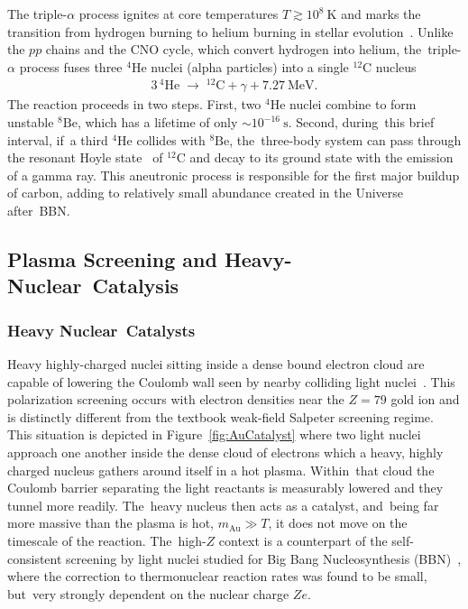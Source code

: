 \documentclass[particles,article,accept,pdftex,moreauthors]{Definitions/mdpi}
\begin{document}
The triple-$\alpha$ process ignites at core temperatures $T \gtrsim 10^{8}~\mathrm{K}$ and marks the transition from hydrogen burning to helium burning in stellar evolution~\cite{Suno:2016fjb}. Unlike the $pp$ chains and the CNO cycle, which convert hydrogen into helium, the~triple-$\alpha$ process fuses three ${}^{4}\mathrm{He}$ nuclei (alpha particles) into a single ${}^{12}\mathrm{C}$ nucleus
\begin{align}
3\,{}^{4}\mathrm{He} \;\longrightarrow\; {}^{12}\mathrm{C} + \gamma + 7.27~\mathrm{MeV}.
\end{align}
The reaction proceeds in two steps. First, two ${}^{4}\mathrm{He}$ nuclei combine to form unstable ${}^{8}\mathrm{Be}$, which has a lifetime of only ${\sim}10^{-16}~\mathrm{s}$. Second, during~this brief interval, if~a third ${}^{4}\mathrm{He}$ collides with ${}^{8}\mathrm{Be}$, the~three-body system can pass through the resonant Hoyle state~\cite{Hoyle:1954zz,Chernykh:2007zz,Epelbaum:2011md} of ${}^{12}\mathrm{C}$ and decay to its ground state with the emission of a gamma ray. This aneutronic process is responsible for the first major buildup of carbon, adding to relatively small abundance created in the Universe after~BBN.

\subsection{Plasma Screening and Heavy-Nuclear~Catalysis}\label{ssec:PlasmaScreening}
\subsubsection{Heavy Nuclear~Catalysts}\label{sssec:HeavyCatalyst}

Heavy highly-charged nuclei sitting inside a dense bound electron cloud are capable of lowering the Coulomb wall seen by nearby colliding light nuclei~\cite{Grayson:2025kva}. This polarization screening occurs with electron densities near the $Z=79$ gold ion and is distinctly different from the textbook weak-field Salpeter screening regime. This situation is depicted in Figure~\ref{fig:AuCatalyst} where two light nuclei approach one another inside the dense cloud of electrons which a heavy, highly charged nucleus gathers around itself in a hot plasma. Within~that cloud the Coulomb barrier separating the light reactants is measurably lowered and they tunnel more readily. The~heavy nucleus then acts as a catalyst, and~being far more massive than the plasma is hot, $m_\mathrm{Au}\gg T$, it does not move on the timescale of the reaction. The~high-$Z$ context is a counterpart of the self-consistent screening by light nuclei studied for Big Bang Nucleosynthesis (BBN)~\cite{Grayson:2024uwg}, where the correction to thermonuclear reaction rates was found to be small, but~very strongly dependent on the nuclear charge $Ze$.
\end{document}
